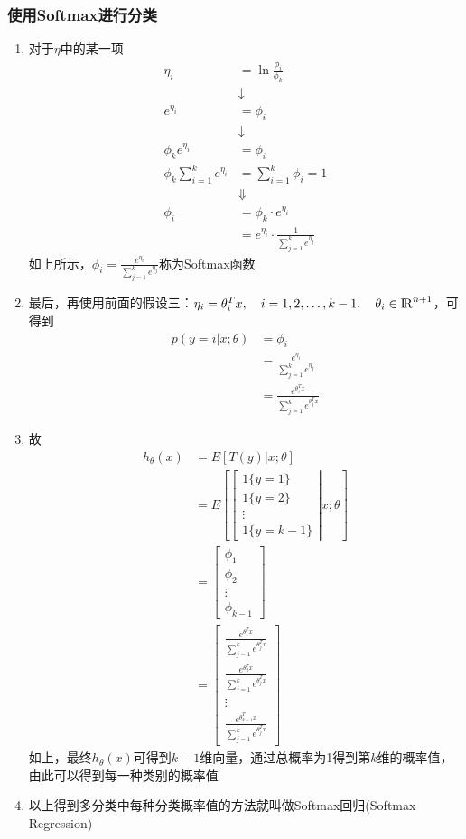 \subsubsection{使用Softmax进行分类}
\begin{enumerate}
	\item 对于$\eta$中的某一项
	\begin{align}
		\eta_i &= \ln{\frac{\phi_i}{\phi_k}} \\
		&\downarrow \\
		e^{\eta_i} &= \phi_i \\
		&\downarrow \\
		\phi_k e^{\eta_i} &= \phi_i \\
		\phi_k\sum_{i=1}^{k}e^{\eta_i} &= \sum_{i=1}^{k}\phi_i = 1 \\
		&\Downarrow \\
		\phi_i &= \phi_k\cdot e^{\eta_i} \\
		&= e^{\eta_i} \cdot \frac{1}{\sum_{j=1}^{k}e^{\eta_j}}
	\end{align}
	如上所示，$\phi_i = \frac{e^{\eta_i}}{\sum_{j=1}^{k}e^{\eta_j}}$称为Softmax函数
	\item 最后，再使用前面的假设三：$\eta_i = \theta_i^Tx, \quad i=1,2, \dots, k-1, \quad \theta_i \in {\rm I\!R}^{n+1}$，可得到
	\begin{align}
		p(y=i|x; \theta) &= \phi_i \\
		&= \frac{e^{\eta_i}}{\sum_{j=1}^{k}e^{\eta_j}} \\ 
		&= \frac{e^{\theta_i^Tx}}{\sum_{j=1}^{k}e^{\theta_j^Tx}}
	\end{align}
	\item 故
	\begin{align}
		h_\theta(x) &= E\left[T(y)|x;\theta\right] \\
		&= E\left[\left[\begin{matrix} 1\{y=1\} \\ 1\{y=2\} \\ \vdots \\ 1\{y=k-1\} \end{matrix}\right|x;\theta\right] \\
		&= \left[\begin{matrix}\phi_1 \\ \phi_2 \\ \vdots \\ \phi_{k-1} \end{matrix}\right] \\ 
		&= \left[\begin{matrix}
		\frac{e^{\theta_1^Tx}}{\sum_{j=1}^{k}e^{\theta_j^Tx}} \\
		\frac{e^{\theta_2^Tx}}{\sum_{j=1}^{k}e^{\theta_j^Tx}} \\
		\vdots \\
		\frac{e^{\theta_{k-1}^Tx}}{\sum_{j=1}^{k}e^{\theta_j^Tx}}
		\end{matrix}\right]
	\end{align}
	如上，最终$h_\theta(x)$可得到$k-1$维向量，通过总概率为1得到第$k$维的概率值，由此可以得到每一种类别的概率值
	\item 以上得到多分类中每种分类概率值的方法就叫做Softmax回归(Softmax Regression)
\end{enumerate}


